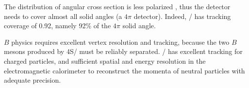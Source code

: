 The distribution of angular cross section is less
polarized \cite{Boutigny:1995ib,McGregor:2008ek}, thus the detector needs to
cover almost all solid angles (a $4\pi$ detector).
Indeed, \BaBar/ has tracking coverage of 0.92, namely 92\% of the $4\pi$ solid
angle.

$B$ physics requires excellent vertex resolution and tracking, because the two
$B$ mesons produced by \Y4S/ must be reliably separated.
\BaBar/ has excellent tracking for charged particles, and sufficient spatial
and energy resolution in the electromagnetic calorimeter to reconstruct the
momenta of neutral particles \cite{Bauer:2005} with adequate precision.
